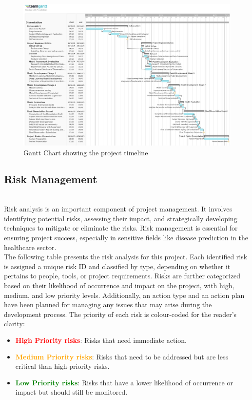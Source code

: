 \begin{figure}[H]
    \centering
    \includegraphics[width=\textwidth]{appendices/images/Dependency_GanttChart.jpg}
    \caption{Gantt Chart showing the project timeline}
    \label{fig:Gantt Chart}
\end{figure}


\vspace{0.5 cm}
\subsection{Risk Management}\leavevmode
\\Risk analysis is an important component of project management. It involves identifying potential risks, assessing their impact, and strategically developing techniques to mitigate or eliminate the risks.
Risk management is essential for ensuring project success, especially in sensitive fields like disease prediction in the healthcare sector. 
\\
The following table presents the risk analysis for this project. Each identified risk is assigned a unique risk ID and classified by type, depending on whether it pertains to people, tools, or project requirements. Risks are further categorized based on their likelihood of occurrence and impact on the project, with high, medium, and low priority levels. Additionally, an action type and an action plan have been planned for managing any issues that may arise during the development process. 
\vspace{0.5 cm}
The priority of each risk is colour-coded for the reader's clarity:

\begin{itemize}
    \item \textbf{\textcolor{red}{High Priority risks}}: Risks that need immediate action.
    \item \textbf{\textcolor{orange}{Medium Priority risks}}: Risks that need to be addressed but are less critical than high-priority risks.
    \item \textbf{\textcolor{green}{Low Priority risks}}: Risks that have a lower likelihood of occurrence or impact but should still be monitored.
\end{itemize}
\vspace{0.5 cm}
\\

